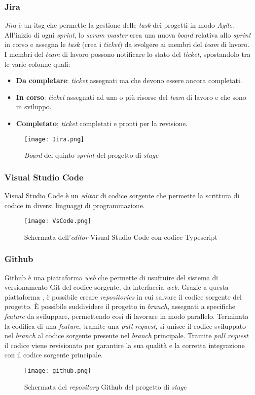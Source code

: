 \subsubsection{Jira}
\textit{Jira} è un \gls{itsg} che permette la gestione delle \textit{task} dei progetti in modo \textit{Agile}. All'inizio di ogni \textit{sprint}, lo \textit{scrum master} crea una nuova \textit{board} relativa allo \textit{sprint} in corso e assegna le \textit{task} (crea i \textit{ticket}) da svolgere ai membri del \textit{team} di lavoro.
I membri del \textit{team} di lavoro possono notificare lo stato del \textit{ticket}, spostandolo tra le varie colonne quali: 
\begin{itemize}
    \item \textbf{Da completare}: \textit{ticket} assegnati ma che devono essere ancora completati.
    \item \textbf{In corso}: \textit{ticket} assegnati ad una o più risorse del \textit{team} di lavoro e che sono in sviluppo.
    \item \textbf{Completato}; \textit{ticket} completati e pronti per la revisione.
\end{itemize}
\begin{figure}[H]
    \centering
    \texttt{[image: Jira.png]}
    \caption{\textit{Board} del quinto \textit{sprint} del progetto di \textit{stage}}
    \label{fig:Jira}
\end{figure}
\subsubsection{Visual Studio Code}
Visual Studio Code è un \textit{editor} di codice sorgente che permette la scrittura di codice in diversi linguaggi di programmazione.
\begin{figure}[H]
    \centering
    \texttt{[image: VsCode.png]}
    \caption{Schermata dell'\textit{editor} Visual Studio Code con codice Typescript}
    \label{fig:VsCode}
\end{figure}
\subsubsection{Github}
Github è una piattaforma \textit{web} che permette di usufruire del sistema di versionamento Git del codice sorgente, da interfaccia \textit{web}.
Grazie a questa piattaforma , è possibile creare \textit{repositories} in cui salvare il codice sorgente del progetto. 
È possibile suddividere il progetto in \textit{branch}, assegnati a specifiche \textit{feature} da sviluppare, permettendo cosi di lavorare in modo parallelo.
Terminata la codifica di una \textit{feature}, tramite una \textit{pull request}, si unisce il codice sviluppato nel \textit{branch} al codice sorgente presente nel \textit{branch} principale. Tramite \textit{pull request} il codice viene revisionato per garantire la sua qualità e la corretta integrazione con il codice sorgente principale.
\begin{figure}[H]
    \centering
    \texttt{[image: github.png]}
    \caption{Schermata del \textit{repository} Github del progetto di \textit{stage}}
    \label{fig:Github}
\end{figure}
